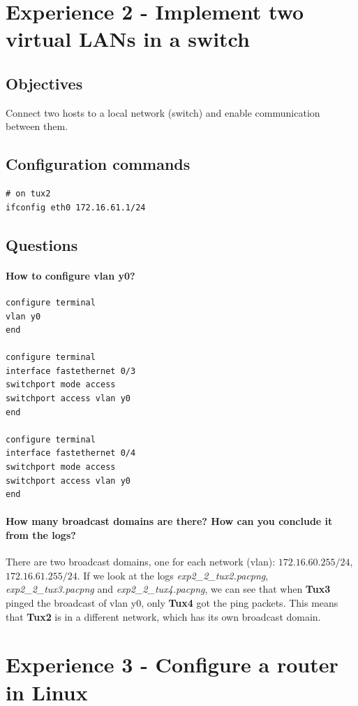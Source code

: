 \documentclass[11pt]{report}
\newcommand{\tux}[1]{\textbf{Tux#1}}
\begin{document}
\section{Experience 2 - Implement two virtual LANs in a switch}

\subsection{Objectives}
Connect two hosts to a local network (switch) and enable communication between
them.

\subsection{Configuration commands}
\begin{lstlisting}
# on tux2
ifconfig eth0 172.16.61.1/24
\end{lstlisting}

\subsection{Questions}
\paragraph{How to configure vlan y0?}
\begin{lstlisting}
configure terminal
vlan y0
end

configure terminal 
interface fastethernet 0/3
switchport mode access
switchport access vlan y0
end

configure terminal 
interface fastethernet 0/4
switchport mode access
switchport access vlan y0
end
\end{lstlisting}

\paragraph{How many broadcast domains are there? How can you conclude it from the logs?}
There are two broadcast domains, one for each network (vlan):
$172.16.60.255/24$, $172.16.61.255/24$. If we look at the logs
\textit{exp2\_2\_tux2.pacpng}, \textit{exp2\_2\_tux3.pacpng} and \textit{exp2\_2\_tux4.pacpng},
we can see that when \tux{3} pinged the broadcast of vlan y0, only \tux{4}
got the ping packets. This means that \tux{2} is in a different network, which
has its own broadcast domain.

\section{Experience 3 - Configure a router in Linux}
\end{document}
